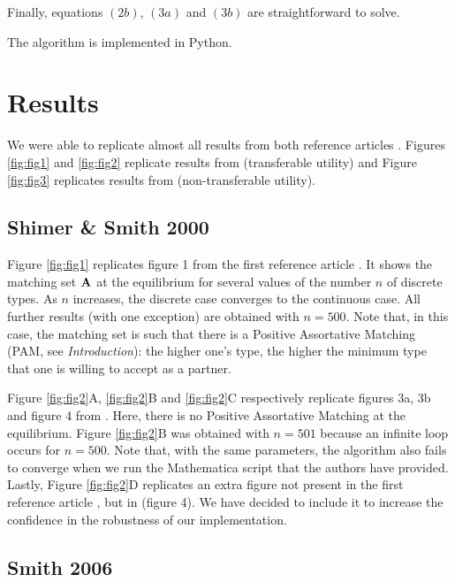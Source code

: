 Finally, equations $(2b)$, $(3a)$ and $(3b)$ are straightforward to solve.

The algorithm is implemented in Python.





\section*{Results}

We were able to replicate almost all results from both reference articles \citep{shimer_assortative_2000,smith_marriage_2006}. Figures \ref{fig:fig1} and \ref{fig:fig2} replicate results from \citep{shimer_assortative_2000} (transferable utility) and Figure \ref{fig:fig3} replicates results from \citep{smith_marriage_2006} (non-transferable utility).

\subsection*{Shimer \& Smith 2000}

Figure \ref{fig:fig1} replicates figure 1 from the first reference article \citep{shimer_assortative_2000}. It shows the matching set $\boldsymbol{\mathbf{A}}$ at the equilibrium for several values of the number $n$ of discrete types. As $n$ increases, the discrete case converges to the continuous case. All further results (with one exception) are obtained with $n=500$. Note that, in this case, the matching set is such that there is a Positive Assortative Matching (PAM, see \textit{Introduction}): the higher one's type, the higher the minimum type that one is willing to accept as a partner.

Figure \ref{fig:fig2}A, \ref{fig:fig2}B and \ref{fig:fig2}C respectively replicate figures 3a, 3b and figure 4 from \citep{shimer_assortative_2000}. Here, there is no Positive Assortative Matching at the equilibrium. Figure \ref{fig:fig2}B was obtained with $n=501$ because an infinite loop occurs for $n=500$. Note that, with the same parameters, the algorithm also fails to converge when we run the Mathematica script that the authors have provided. Lastly, Figure \ref{fig:fig2}D replicates an extra figure not present in the first reference article \citep{shimer_assortative_2000}, but in \citep{smith_frictional_2011} (figure 4). We have decided to include it to increase the confidence in the robustness of our implementation.



\subsection*{Smith 2006}

